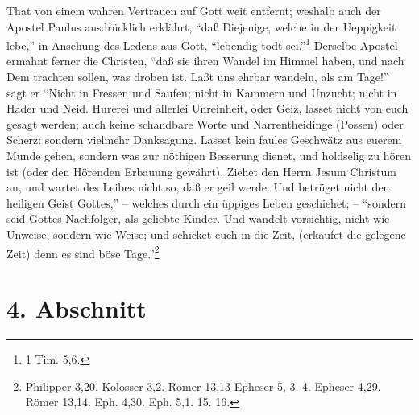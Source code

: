 That von einem wahren Vertrauen auf Gott weit entfernt; weshalb auch der Apostel Paulus ausdrücklich erklährt, "`daß Diejenige, welche in der Ueppigkeit lebe,"' in Ansehung des Ledens aus Gott, "`lebendig todt sei."'\footnote{1 Tim. 5,6.} Derselbe Apostel ermahnt ferner die Christen,  "`daß sie ihren Wandel im Himmel haben, und nach Dem trachten sollen, was droben ist. Laßt uns ehrbar wandeln, als am Tage!"' sagt er "`Nicht in Fressen und Saufen; nicht in Kammern und Unzucht; nicht in Hader und Neid. Hurerei und allerlei Unreinheit, oder Geiz, lasset nicht von euch gesagt werden; auch keine schandbare Worte und Narrentheidinge (Possen) oder Scherz: sondern vielmehr Danksagung. Lasset kein faules Geschwätz aus euerem Munde gehen, sondern was zur nöthigen Besserung dienet, und holdselig zu hören ist (oder den Hörenden Erbauung gewährt). Ziehet den Herrn Jesum Christum an, und wartet des Leibes nicht so, daß er geil werde. Und betrüget nicht den heiligen Geist Gottes,"' -- welches durch ein üppiges Leben geschiehet; -- "`sondern seid Gottes Nachfolger, als geliebte Kinder. Und wandelt vorsichtig, nicht wie Unweise, sondern wie Weise; und schicket euch in die Zeit, (erkaufet die gelegene Zeit) denn es sind böse Tage."'\footnote{Philipper 3,20.  Kolosser 3,2.  Römer 13,13  Epheser 5, 3. 4.  Epheser 4,29. Römer 13,14. Eph. 4,30. Eph. 5,1. 15. 16.}

\section{4. Abschnitt}

